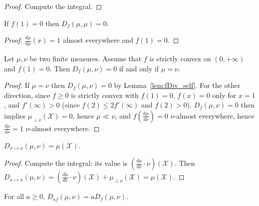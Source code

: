 \begin{proof} %
Compute the integral.
\end{proof}


\begin{lemma}
  \label{lem:fDiv_self}
  \leanok
  If $f(1) = 0$ then $D_{f}(\mu, \mu) = 0$.
\end{lemma}

\begin{proof} \leanok
$\frac{d \mu}{d \mu}(x) = 1$ almost everywhere and $f(1) = 0$.
\end{proof}


\begin{lemma}
  \label{lem:fDiv_eq_zero_iff}
  \leanok
  Let $\mu, \nu$ be two finite measures. Assume that $f$ is strictly convex on $(0, +\infty)$ and $f(1) = 0$. Then $D_f(\mu, \nu) = 0$ if and only if $\mu = \nu$.
\end{lemma}

\begin{proof}\leanok
{}
If $\mu = \nu$ then $D_f(\mu, \nu) = 0$ by Lemma~\ref{lem:fDiv_self}.
For the other direction, since $f \ge 0$ is strictly convex with $f(1) = 0$, $f(x) = 0$ only for $x = 1$, and $f'(\infty) > 0$ (since $f(2) \le 2 f'(\infty)$ and $f(2) > 0$).
$D_f(\mu, \nu) = 0$ then implies $\mu_{\perp \nu}(\mathcal X) = 0$, hence $\mu \ll \nu$, and $f(\frac{d\mu}{d\nu}) = 0$ $\nu$-almost everywhere, hence $\frac{d\mu}{d\nu} = 1$ $\nu$-almost everywhere.
\end{proof}


\begin{lemma}
  \label{lem:fDiv_id}
  $D_{x \mapsto x}(\mu, \nu) = \mu(\mathcal X)$.
\end{lemma}

\begin{proof} %
Compute the integral: its value is $(\frac{d\mu}{d\nu}\cdot \nu)(\mathcal X)$. Then
$D_{x\mapsto x}(\mu, \nu) = (\frac{d\mu}{d\nu}\cdot \nu)(\mathcal X) + \mu_{\perp \nu}(\mathcal X) = \mu (\mathcal X)$.
\end{proof}


\begin{lemma}
  \label{lem:fDiv_mul}
  \leanok
  For all $a \ge 0$, $D_{a f}(\mu, \nu) = a D_{f}(\mu, \nu)$.
\end{lemma}

